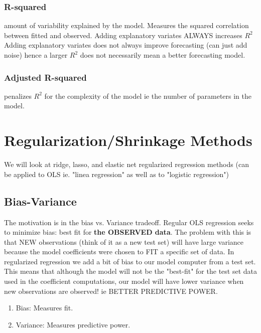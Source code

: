 \documentclass{article}
\begin{document}
\subsubsection{R-squared}
amount of variability explained by the model. Measures the squared correlation between fitted and observed. 
Adding explanatory variates ALWAYS increases $R^2$
Adding explanatory variates does not always improve forecasting (can just add noise) hence a larger $R^2$ does not necessarily mean a better forecasting model. 
\subsubsection{Adjusted R-squared}
penalizes $R^2$ for the complexity of the model ie the number of parameters in the model.



\section{Regularization/Shrinkage Methods}
We will look at ridge, lasso, and elastic net regularized regression methods (can be applied to OLS ie. "linea regression" as well as to "logistic regression")

\subsection{Bias-Variance}
The motivation is in the bias vs. Variance tradeoff. Regular OLS regression seeks to minimize bias: best fit for \textbf{the OBSERVED data}. The problem with this is that NEW observations (think of it as a new test set) will have large variance because the model coefficients were chosen to FIT a specific set of data. In regularized regression we add a bit of bias to our model computer from a test set. This means that although the model will not be the "best-fit" for the test set data used in the coefficient computations, our model will have lower variance when new observations are observed! ie BETTER PREDICTIVE POWER. 
\begin{enumerate}
\item Bias: Measures fit. 
\item Variance: Measures predictive power. 
\end{enumerate}
\end{document}
